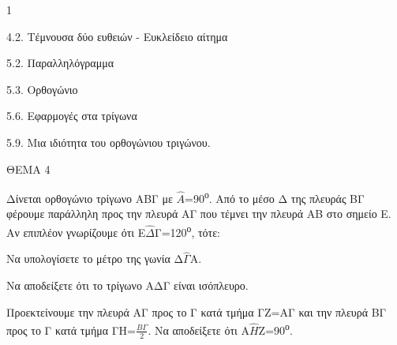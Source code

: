 \begin{ylh}{1}
    \item 4.2. Τέμνουσα δύο ευθειών - Ευκλείδειο αίτημα
    \item 5.2. Παραλληλόγραμμα
    \item 5.3. Ορθογώνιο
    \item 5.6. Εφαρμογές στα τρίγωνα
    \item 5.9. Μια ιδιότητα του ορθογώνιου τριγώνου.
\end{ylh}

ΘΕΜΑ 4

Δίνεται ορθογώνιο τρίγωνο ΑΒΓ με $\widehat{Α}$=90\textsuperscript{ο}. Από το μέσο Δ της πλευράς ΒΓ φέρουμε παράλληλη προς την πλευρά ΑΓ που τέμνει την πλευρά ΑΒ στο σημείο Ε. Αν επιπλέον γνωρίζουμε ότι Ε$\widehat{\Delta}$Γ=120\textsuperscript{ο}, τότε:

\begin{alist}
\item Να υπολογίσετε το μέτρο της γωνία Δ$\widehat{\Gamma}$Α. 

\item Να αποδείξετε ότι το τρίγωνο ΑΔΓ είναι ισόπλευρο. 

\item Προεκτείνουμε την πλευρά ΑΓ προς το Γ κατά τμήμα ΓΖ=ΑΓ και την πλευρά ΒΓ προς το Γ κατά τμήμα ΓΗ=$\frac{Β\Gamma}{2}$. Να αποδείξετε ότι Α$\widehat{Η}$Ζ=90\textsuperscript{ο}. 


\begin{center}
\end{center}
\end{alist}

